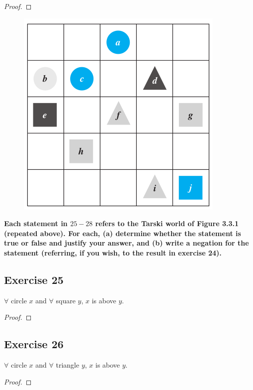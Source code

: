 \documentclass[14pt]{extarticle}
\newcommand{\fa}{\forall}
\begin{document}
\begin{proof}

\end{proof}

\begin{figure}[ht!]
\centering
\includegraphics[scale=0.4]{../images/3.3.1.png}
\end{figure}

{\bf \color{cyan} Each statement in $25-28$ refers to the Tarski world of Figure 3.3.1 (repeated above). For each, (a) determine whether the statement is true or false and justify your answer, and (b) write a negation for the statement (referring, if you wish, to the result in exercise 24).}

\subsection{Exercise 25}
$\fa$ circle $x$ and $\fa$ square $y$, $x$ is above $y$.

\begin{proof}

\end{proof}

\subsection{Exercise 26}
$\fa$ circle $x$ and $\fa$ triangle $y$, $x$ is above $y$.

\begin{proof}

\end{proof}
\end{document}
